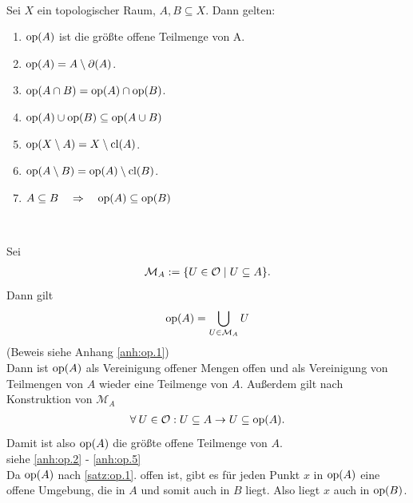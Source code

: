     \begin{satz} \label{satz:op}\ \\
        Sei $X$ ein topologischer Raum, $A, B \subseteq X$. Dann gelten:
        \begin{enumerate}
            \item \label{satz:op.1} $\text{op}(A)$ ist die größte offene Teilmenge von A. %
            \item \label{satz:op.2} $\text{op}(A) = A \setminus \partial(A)$.
            \item \label{satz:op.3} $\text{op}(A \cap B) = \text{op}(A) \cap \text{op}(B)$.
            \item \label{satz:op.4} $\text{op}(A) \cup \text{op}(B) \subseteq \text{op}(A \cup B)$
            \item \label{satz:op.5} $\text{op}(X \setminus A) = X \setminus \text{cl}(A)$.
            \item \label{satz:op.6} $\text{op}(A \setminus B) = \text{op}(A) \setminus \text{cl}(B)$. 
            \item \label{satz:op.7} $A \subseteq B \quad \Rightarrow \quad \text{op}(A) \subseteq \text{op}(B)$	
        \end{enumerate}	
        
    \end{satz}

    \begin{bew} 
    \ 

    \noindent
     Sei
        \begin{align}
            \mathcal{M}_A := \{U \in \mathcal{O} \mid U \subseteq A\}.		
        \end{align}
        Dann gilt 
        \begin{align}
            \text{op}(A) = \bigcup\limits_{U \in \mathcal{M}_A} U
        \end{align}
        (Beweis siehe Anhang \ref{anh:op.1})\\ 
        Dann ist $\text{op}(A)$ als Vereinigung offener Mengen offen und als Vereinigung von Teilmengen von $A$ wieder eine Teilmenge von $A$. Außerdem gilt nach Konstruktion von $\mathcal{M}_A$
        \begin{align}
            \forall\: U \in \mathcal{O} : U \subseteq A \rightarrow U \subseteq \text{op}(A).
        \end{align}
        Damit ist also $\text{op}(A)$ die größte offene Teilmenge von $A$.
        \\

        \noindent
         siehe \ref{anh:op.2} - \ref{anh:op.5}	\\

        \noindent
         Da $\text{op}(A)$ nach \ref{satz:op.1}. offen ist, gibt es für jeden Punkt $x$ in $\text{op}(A)$ eine offene Umgebung, die in $A$ und somit auch in $B$ liegt. Also liegt $x$ auch in $\text{op}(B)$.
        
    \end{bew}


